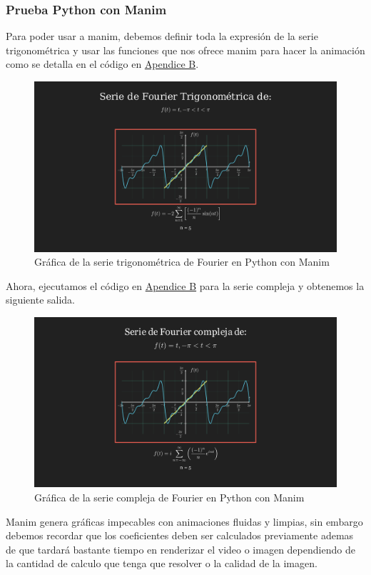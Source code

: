 \subsubsection{Prueba Python con Manim}
Para poder usar a manim, debemos definir toda la expresión de la serie trigonométrica y usar las funciones que nos ofrece manim para hacer la animación como se detalla en el código en \hyperref[app2:trig-code-python-manim]{Apendice B}.
\begin{figure}[H]
	\centering
	\includegraphics[width=1\textwidth]{img/chapter02/manim-trig-series-graph.png}
	\caption{Gráfica de la serie trigonométrica de Fourier en Python con Manim}
	\label{fig:python-manim-trig-series}  %
\end{figure}
Ahora, ejecutamos el código en \hyperref[app2:complex-code-python-manim]{Apendice B} para la serie compleja y obtenemos la siguiente salida.
\begin{figure}[H]
	\centering
	\includegraphics[width=1\textwidth]{img/chapter02/manim-complex-series-graph.png}
	\caption{Gráfica de la serie compleja de Fourier en Python con Manim}
	\label{fig:python-manim-complex-series}  %
\end{figure}
Manim genera gráficas impecables con animaciones fluidas y limpias, sin embargo debemos recordar que los coeficientes deben ser calculados previamente ademas de que tardará bastante tiempo en renderizar el video o imagen dependiendo de la cantidad de calculo que tenga que resolver o la calidad de la imagen.
